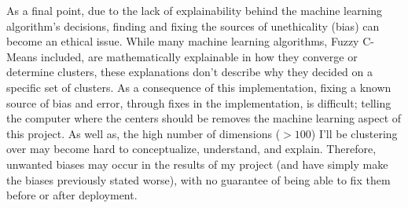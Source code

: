 \documentclass[10pt,twocolumn]{article}
\begin{document}
As a final point, due to the lack of explainability behind the machine learning algorithm’s decisions, finding and fixing the sources of unethicality (bias) can become an ethical issue. While many machine learning algorithms, Fuzzy C-Means included, are mathematically explainable in how they converge or determine clusters, these explanations don’t describe why they decided on a specific set of clusters. As a consequence of this implementation, fixing a known source of bias and error, through fixes in the implementation, is difficult; telling the computer where the centers should be removes the machine learning aspect of this project. As well as, the high number of dimensions (\(>100\)) I'll be clustering over may become hard to conceptualize, understand, and explain. Therefore, unwanted biases may occur in the results of my project (and have simply make the biases previously stated worse), with no guarantee of being able to fix them before or after deployment. 

\end{document}
